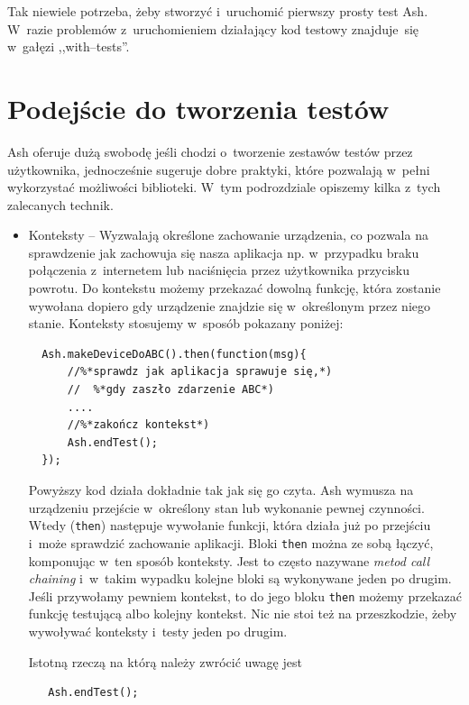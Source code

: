 \documentclass[brudnopis]{xmgr}
\begin{document}
Tak niewiele potrzeba, żeby stworzyć i~uruchomić pierwszy prosty test Ash. W~razie problemów z~uruchomieniem działający kod testowy znajduje~się w~gałęzi ,,with--tests''.

\section{Podejście do tworzenia testów}

Ash oferuje dużą swobodę jeśli chodzi o~tworzenie zestawów testów przez użytkownika, jednocześnie sugeruje dobre praktyki, które pozwalają w~pełni wykorzystać możliwości biblioteki. W~tym podrozdziale opiszemy kilka z~tych zalecanych technik.    

\begin{itemize}
  \item Konteksty -- Wyzwalają określone zachowanie urządzenia, co pozwala na sprawdzenie jak zachowuja się nasza aplikacja np. w~przypadku braku połączenia z~internetem lub naciśnięcia przez użytkownika przycisku powrotu. Do kontekstu możemy przekazać dowolną funkcję, która zostanie wywołana dopiero gdy urządzenie znajdzie się w~określonym przez niego stanie. Konteksty stosujemy w~sposób pokazany poniżej:

\begin{lstlisting}
  Ash.makeDeviceDoABC().then(function(msg){
      //%*sprawdz jak aplikacja sprawuje się,*) 
      //  %*gdy zaszło zdarzenie ABC*)
      ....
      //%*zakończ kontekst*)
      Ash.endTest();
  });
\end{lstlisting}

Powyższy kod działa dokładnie tak jak się go czyta. Ash wymusza na urządzeniu przejście w~określony stan lub wykonanie pewnej czynności. Wtedy (\texttt{then}) następuje wywołanie funkcji, która działa już po przejściu i~może sprawdzić zachowanie aplikacji. Bloki \texttt{then} można ze sobą łączyć, komponując w~ten sposób konteksty. Jest to często nazywane \textit{metod call chaining} i~w~takim wypadku kolejne bloki są wykonywane jeden po drugim. Jeśli przywołamy pewniem kontekst, to do jego bloku \texttt{then} możemy przekazać funkcję testującą albo kolejny kontekst. Nic nie stoi też na przeszkodzie, żeby wywoływać konteksty i~testy jeden po drugim. 

Istotną rzeczą na którą należy zwrócić uwagę jest 

\begin{lstlisting}
   Ash.endTest();
\end{lstlisting}


\end{itemize}
\end{document}
